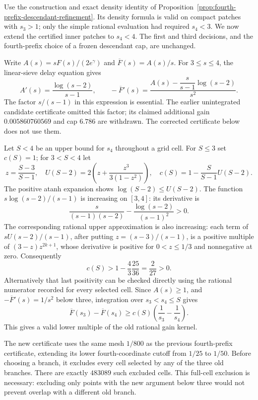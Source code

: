 \documentclass[11pt]{article}
\begin{document}
Use the construction and exact density identity of
Proposition~\ref{prop:fourth-prefix-descendant-refinement}.
Its density formula is valid on compact patches with $s_3>1$;
only the simple rational evaluation had required $s_4<3$.
We now extend the certified inner patches to $s_4<4$.
The first and third decisions, and the fourth-prefix choice of a
frozen descendant cap, are unchanged.

Write $A(s)=sF(s)/(2e^\gamma)$ and
$\overline F(s)=A(s)/s$. For $3\le s\le4$, the linear-sieve
delay equation gives
\[
 A'(s)=\frac{\log(s-2)}{s-1},\qquad
 -\overline F'(s)=
 \frac{A(s)-\dfrac{s}{s-1}\log(s-2)}{s^2}.
\]
The factor $s/(s-1)$ in this expression is essential.
The earlier unintegrated candidate certificate omitted this factor;
its claimed additional gain $0.005860760569$ and cap $6.786$
are withdrawn. The corrected certificate below does not use them.

Let $S<4$ be an upper bound for $s_4$ throughout a grid cell.
For $S\le3$ set $c(S)=1$; for $3<S<4$ let
\[
 z=\frac{S-3}{S-1},\quad
 U(S-2)=2\left(z+\frac{z^3}{3(1-z^2)}\right),\quad
 c(S)=1-\frac{S}{S-1}U(S-2).
\]
The positive atanh expansion shows $\log(S-2)\le U(S-2)$.
The function $s\log(s-2)/(s-1)$ is increasing on $[3,4]$:
its derivative is
\[
 \frac{s}{(s-1)(s-2)}-\frac{\log(s-2)}{(s-1)^2}>0.
\]
The corresponding rational upper approximation is also increasing:
each term of $sU(s-2)/(s-1)$, after putting
$z=(s-3)/(s-1)$, is a positive multiple of
$(3-z)z^{2k+1}$, whose derivative is positive for
$0<z\le1/3$ and nonnegative at zero. Consequently
\[
 c(S)>1-\frac43\frac{25}{36}=\frac2{27}>0.
\]
Alternatively that last positivity can be checked directly using
the rational numerator recorded for every selected cell.
Since $A(s)\ge1$, and $-\overline F'(s)=1/s^2$ below three,
integration over $s_3<s_4\le S$ gives
\begin{equation}\label{eq:fourth-prefix-tail-kernel}
 \overline F(s_3)-\overline F(s_4)
 \ge c(S)\left(\frac1{s_3}-\frac1{s_4}\right).
\end{equation}
This gives a valid lower multiple of the old rational gain kernel.

The new certificate uses the same mesh $1/800$ as the previous
fourth-prefix certificate, extending its lower fourth-coordinate
cutoff from $1/25$ to $1/50$. Before choosing a branch, it excludes
every cell selected by any of the three old branches. There are
exactly $483089$ such excluded cells. This full-cell exclusion is
necessary: excluding only points with the new argument below three
would not prevent overlap with a different old branch.
\end{document}
